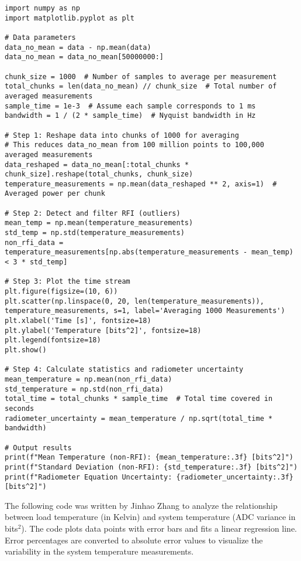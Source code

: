 \documentclass[10pt, preprint]{aastex}
\begin{document}
\begin{verbatim}
import numpy as np
import matplotlib.pyplot as plt

# Data parameters
data_no_mean = data - np.mean(data)
data_no_mean = data_no_mean[50000000:]

chunk_size = 1000  # Number of samples to average per measurement
total_chunks = len(data_no_mean) // chunk_size  # Total number of averaged measurements
sample_time = 1e-3  # Assume each sample corresponds to 1 ms
bandwidth = 1 / (2 * sample_time)  # Nyquist bandwidth in Hz

# Step 1: Reshape data into chunks of 1000 for averaging
# This reduces data_no_mean from 100 million points to 100,000 averaged measurements
data_reshaped = data_no_mean[:total_chunks * chunk_size].reshape(total_chunks, chunk_size)
temperature_measurements = np.mean(data_reshaped ** 2, axis=1)  # Averaged power per chunk

# Step 2: Detect and filter RFI (outliers)
mean_temp = np.mean(temperature_measurements)
std_temp = np.std(temperature_measurements)
non_rfi_data = temperature_measurements[np.abs(temperature_measurements - mean_temp) < 3 * std_temp]

# Step 3: Plot the time stream
plt.figure(figsize=(10, 6))
plt.scatter(np.linspace(0, 20, len(temperature_measurements)), temperature_measurements, s=1, label='Averaging 1000 Measurements')
plt.xlabel('Time [s]', fontsize=18)
plt.ylabel('Temperature [bits^2]', fontsize=18)
plt.legend(fontsize=18)
plt.show()

# Step 4: Calculate statistics and radiometer uncertainty
mean_temperature = np.mean(non_rfi_data)
std_temperature = np.std(non_rfi_data)
total_time = total_chunks * sample_time  # Total time covered in seconds
radiometer_uncertainty = mean_temperature / np.sqrt(total_time * bandwidth)

# Output results
print(f"Mean Temperature (non-RFI): {mean_temperature:.3f} [bits^2]")
print(f"Standard Deviation (non-RFI): {std_temperature:.3f} [bits^2]")
print(f"Radiometer Equation Uncertainty: {radiometer_uncertainty:.3f} [bits^2]")
\end{verbatim}

The following code was written by Jinhao Zhang to analyze the relationship between load temperature (in Kelvin) and system temperature (ADC variance in bits\(^2\)). The code plots data points with error bars and fits a linear regression line. Error percentages are converted to absolute error values to visualize the variability in the system temperature measurements.
\end{document}
